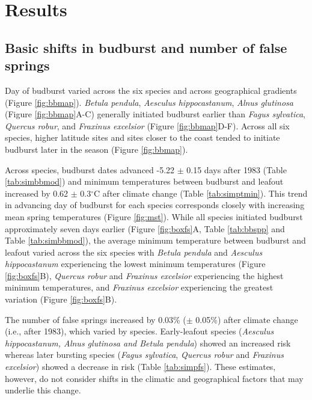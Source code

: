 \documentclass{article}\usepackage[]{graphicx}\usepackage[]{color}
\begin{document}
\renewcommand{\thetable}{\arabic{table}}
\renewcommand{\thefigure}{\arabic{figure}}
\renewcommand{\labelitemi}{$-$}





\section*{Results}
\subsection*{Basic shifts in budburst and number of false springs}
Day of budburst varied across the six species and across geographical gradients (Figure \ref{fig:bbmap}). \textit{Betula pendula}, \textit{Aesculus hippocastanum}, \textit{Alnus glutinosa} (Figure \ref{fig:bbmap}A-C) generally initiated budburst earlier than \textit{Fagus sylvatica}, \textit{Quercus robur}, and \textit{Fraxinus excelsior} (Figure \ref{fig:bbmap}D-F). Across all six species, higher latitude sites and sites closer to the coast tended to initiate budburst later in the season (Figure \ref{fig:bbmap}).  

Across species, budburst dates advanced -5.22 $\pm$ 0.15 days after 1983 (Table \ref{tab:simbbmod}) and minimum temperatures between budburst and leafout increased by 0.62 $\pm$ 0.3$^{\circ}$C after climate change (Table \ref{tab:simptmin}). This trend in advancing day of budburst for each species corresponds closely with increasing mean spring temperatures (Figure \ref{fig:mst}). While all species initiated budburst approximately seven days earlier (Figure \ref{fig:boxfs}A, Table \ref{tab:bbspp} and Table \ref{tab:simbbmod}), the average minimum temperature between budburst and leafout varied across the six species with \textit{Betula pendula} and \textit{Aesculus hippocastanum} experiencing the lowest minimum temperatures (Figure \ref{fig:boxfs}B), \textit{Quercus robur} and \textit{Fraxinus excelsior} experiencing the highest minimum temperatures, and \textit{Fraxinus excelsior} experiencing the greatest variation (Figure \ref{fig:boxfs}B). 

The number of false springs increased by 0.03\% ($\pm$ 0.05\%) after climate change (i.e., after 1983), which varied by species. Early-leafout species (\textit{Aesculus hippocastanum, \textit{Alnus glutinosa} and \textit{Betula pendula}}) showed an increased risk whereas later bursting species (\textit{Fagus sylvatica}, \textit{Quercus robur} and \textit{Fraxinus excelsior}) showed a decrease in risk (Table \ref{tab:simpfs}). These estimates, however, do not consider shifts in the climatic and geographical factors that may underlie this change.
\end{document}
